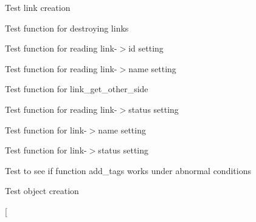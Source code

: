 \begin{DoxyRefList}
\item[\label{test__test000124}%
\hypertarget{test__test000124}{}%
Member \hyperlink{link__test_8h_a24b5463da176c3e578b0a0fa8bb1f9f0}{test2\+\_\+link\+\_\+create} ()]Test link creation  
\item[\label{test__test000145}%
\hypertarget{test__test000145}{}%
Member \hyperlink{link__test_8h_afae7294e1213cade145448511cfae536}{test2\+\_\+link\+\_\+destroy} ()]Test function for destroying links  
\item[\label{test__test000136}%
\hypertarget{test__test000136}{}%
Member \hyperlink{link__test_8h_a0f967a1782dd7264e73ad428d22d125d}{test2\+\_\+link\+\_\+get\+\_\+id} ()]Test function for reading link-\/$>$id setting  
\item[\label{test__test000138}%
\hypertarget{test__test000138}{}%
Member \hyperlink{link__test_8h_a4efc6cfcdc210e2803f9d285734c571e}{test2\+\_\+link\+\_\+get\+\_\+name} ()]Test function for reading link-\/$>$name setting  
\item[\label{test__test000142}%
\hypertarget{test__test000142}{}%
Member \hyperlink{link__test_8h_a9bb64e905b519d629239c31029ec4cd2}{test2\+\_\+link\+\_\+get\+\_\+other\+\_\+side} ()]Test function for link\+\_\+get\+\_\+other\+\_\+side  
\item[\label{test__test000140}%
\hypertarget{test__test000140}{}%
Member \hyperlink{link__test_8h_a7d1062febd832b21e69df5f071425b4c}{test2\+\_\+link\+\_\+get\+\_\+status} ()]Test function for reading link-\/$>$status setting  
\item[\label{test__test000128}%
\hypertarget{test__test000128}{}%
Member \hyperlink{link__test_8h_aa66c1e991620a5a758ba6e4d6b4a8b73}{test2\+\_\+link\+\_\+set\+\_\+name} ()]Test function for link-\/$>$name setting  
\item[\label{test__test000134}%
\hypertarget{test__test000134}{}%
Member \hyperlink{link__test_8h_a315ea19cd24434d2153b5df9f372a561}{test2\+\_\+link\+\_\+set\+\_\+status} ()]Test function for link-\/$>$status setting  
\item[\label{test__test000165}%
\hypertarget{test__test000165}{}%
Member \hyperlink{object__test_8h_a63f0d9bc3c6acd1e7ac25964c0e7d2e7}{test2\+\_\+object\+\_\+add\+\_\+tags} ()]Test to see if function add\+\_\+tags works under abnormal conditions  
\item[\label{test__test000147}%
\hypertarget{test__test000147}{}%
Member \hyperlink{object__test_8h_add54ab5e33a1b0a93e9ddcf73591bd9f}{test2\+\_\+object\+\_\+create} ()]Test object creation  
\item[\label{test__test000163}%

\end{DoxyRefList}
